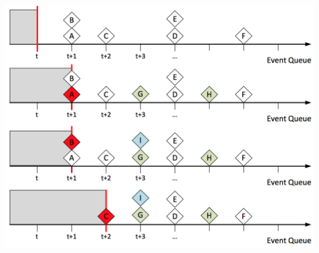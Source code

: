 \begin{minipage}{0.4\textwidth}
	\includegraphics[width=\textwidth]{./bilder/EventQueue}
\end{minipage}

